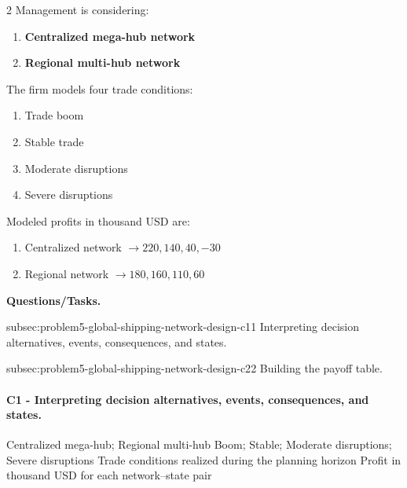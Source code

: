 	\begin{multicols}{2}
		Management is considering:
		\begin{enumerate}[label=\arabic*.]
			\item \textbf{Centralized mega-hub network}
			\item \textbf{Regional multi-hub network}
		\end{enumerate}

		The firm models four trade conditions:
		\begin{enumerate}[label=\arabic*.]
			\item Trade boom
			\item Stable trade
			\item Moderate disruptions
			\item Severe disruptions
		\end{enumerate}

			\columnbreak

		Modeled profits in thousand USD are:
		\begin{enumerate}[label=\arabic*.]
			\item Centralized network $\to 220, 140, 40, -30$
			\item Regional network $\to 180, 160, 110, 60$
		\end{enumerate}
	\end{multicols}

	\textbf{Questions/Tasks.}
	\begin{enumerate}
		\CriterionTask
		{subsec:problem5-global-shipping-network-design-c1}{1}
		{Interpreting decision alternatives, events, consequences, and states.}

		\CriterionTask
		{subsec:problem5-global-shipping-network-design-c2}{2}
		{Building the payoff table.}
	\end{enumerate}

	\paragraph*{C1 - Interpreting decision alternatives, events, consequences, and states.}
	\label{subsec:problem5-global-shipping-network-design-c1}
	\DecisionElementsTable
	{Centralized mega-hub; Regional multi-hub}
	{Boom; Stable; Moderate disruptions; Severe disruptions}
	{Trade conditions realized during the planning horizon}
	{Profit in thousand USD for each network--state pair}



